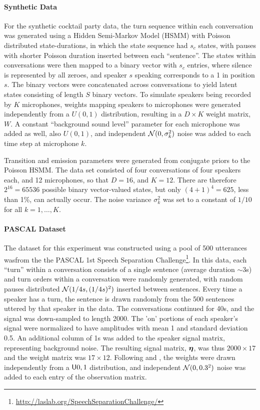 \paragraph{Synthetic Data}
For the synthetic cocktail party data, the turn sequence within each conversation was
generated using a Hidden Semi-Markov Model (HSMM) with Poisson distributed state-durations, in which the state sequence had $s_c$ states, with pauses with
shorter Poisson duration inserted between each ``sentence''.  The
states within conversations were then mapped to a binary vector with
$s_c$ entries, where silence is represented by all zeroes, 
and speaker $s$ speaking corresponds to a 1 in position $s$.  
The binary vectors were concatenated across
conversations to yield latent states consisting of length $S$ binary
vectors.  To simulate speakers being recorded by $K$ microphones,
weights mapping speakers to microphones were generated independently from
a $U(0,1)$ distribution, resulting in a $D \times K$ weight matrix,
$W$.  A constant ``background sound level'' parameter for each microphone was added as
well, also $U(0,1)$, and independent $\mathcal{N}(0,\sigma^2_k)$ noise was added
to each time step at microphone $k$.

Transition and emission parameters were generated from conjugate priors
to the Poisson HSMM.  The data set
consisted of four conversations of four speakers each, and 12
microphones, so that $D = 16$, and $K = 12$.  There are therefore
$2^{16} = 65536$ possible binary vector-valued states, but only
$(4+1)^4 = 625$, less than 1\%, can actually occur.  The noise variance $\sigma^2_k$ 
was set to a constant of $1/10$ for all $k = 1, \dots, K$.

\paragraph{PASCAL Dataset}
The dataset for this experiment was constructed using a pool of 
500 utterances wasfrom the the PASCAL 1st Speech Separation
Challenge\footnote{\url{http://laslab.org/SpeechSeparationChallenge/}}.
In this data, each ``turn'' within a conversation consists of a single sentence
(average duration $\sim 3$s) and turn orders within a conversation were
randomly generated, with random pauses distributed $\mathcal{N}(1/4s,(1/4s)^2)$
inserted between sentences.  Every time a speaker has a turn, the
sentence is drawn randomly from the 500 sentences uttered by that
speaker in the data.  The conversations continued for 40s, and 
the signal was down-sampled to length 2000.  The 'on' portions of each
speaker's signal were normalized to have amplitudes with mean 1 and standard
deviation 0.5.  An additional column of 1s was added to the speaker signal matrix,
representing background noise.  The resulting signal matrix, $\boldsymbol{\eta}$, was thus
$2000 \times 17$ and the weight matrix was $17 \times 12$.  Following
\citet{gael2009infinite} and \citet{valera2015infinite}, the weights
were drawn independently from a $\mathsf{U}{0,1}$ distribution, and
independent $\mathcal{N}(0,0.3^2)$ noise was added to each entry of the
observation matrix. 


